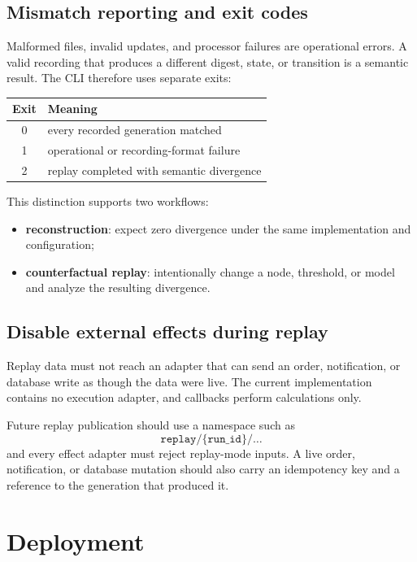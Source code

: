 \documentclass{strategynet-journal}
\begin{document}
\begin{SNcolumns}
\subsection{Mismatch reporting and exit codes}

Malformed files, invalid updates, and processor failures are operational
errors.  A valid recording that produces a different digest, state, or
transition is a semantic result.  The CLI therefore uses separate exits:
\begin{center}
\begin{tabular}{@{}cl@{}}
\toprule
Exit & Meaning \\
\midrule
0 & every recorded generation matched \\
1 & operational or recording-format failure \\
2 & replay completed with semantic divergence \\
\bottomrule
\end{tabular}
\end{center}

This distinction supports two workflows:
\begin{itemize}
  \item \textbf{reconstruction}: expect zero divergence under the same
        implementation and configuration;
  \item \textbf{counterfactual replay}: intentionally change a node, threshold,
        or model and analyze the resulting divergence.
\end{itemize}

\end{SNcolumns}

\clearpage
\subsection{Disable external effects during replay}

Replay data must not reach an adapter that can send an order, notification,
or database write as though the data were live.  The current implementation
contains no execution adapter, and callbacks perform calculations only.

Future replay publication should use a namespace such as
\[
  \texttt{replay/\{run\_id\}/\ldots}
\]
and every effect adapter must reject replay-mode inputs.  A live order,
notification, or database mutation should also carry an idempotency key and a
reference to the generation that produced it.

\section{Deployment}
\end{document}
